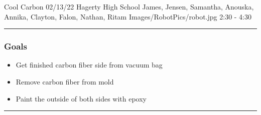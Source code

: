 \insertmeeting 
	{Cool Carbon} 
	{02/13/22} 
	{Hagerty High School}
	{James, Jensen, Samantha, Anouska, Annika, Clayton, Falon, Nathan, Ritam}
	{Images/RobotPics/robot.jpg}
	{2:30 - 4:30}
	
\noindent\hfil\rule{\textwidth}{.4pt}\hfil
\subsubsection*{Goals}
\begin{itemize}
    \item Get finished carbon fiber side from vacuum bag
	\item Remove carbon fiber from mold
	\item Paint the outside of both sides with epoxy

\end{itemize} 

\noindent\hfil\rule{\textwidth}{.4pt}\hfil

